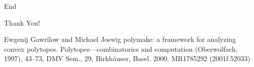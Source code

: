 \documentclass[9pt]{beamer}
\theoremstyle{definition}
\begin{document}
\begin{frame}[fragile]{End}
  \begin{center}
    Thank You!
  \end{center}
  \footnotesize{
    \begin{thebibliography}{99} %
     Ewgenij Gawrilow and Michael Joswig
      \newblock polymake: a framework for analyzing convex polytopes. Polytopes—combinatorics and computation
      \newblock (Oberwolfach, 1997), 43–73, DMV Sem., 29, Birkhäuser, Basel, 2000. MR1785292 (2001f:52033)
      
  \end{thebibliography}
  }
\end{frame}

\end{document}

